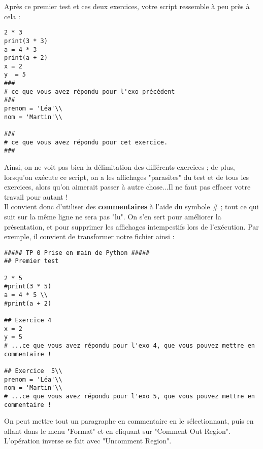 \begin{multicols}{2}
\exer{}



Après ce premier test et ces deux exercices, votre script ressemble à peu près à cela : 
\begin{lstlisting}
2 * 3
print(3 * 3)
a = 4 * 3
print(a + 2)
x = 2
y  = 5
###
# ce que vous avez répondu pour l'exo précédent 
###
prenom = 'Léa'\\
nom = 'Martin'\\

###
# ce que vous avez répondu pour cet exercice.
###
\end{lstlisting}
Ainsi, on ne voit pas bien la délimitation des différents exercices ; de plus, lorsqu'on exécute ce script, on a les affichages "parasites" du test et de tous les exercices, alors qu'on aimerait passer à autre chose...Il ne faut pas effacer votre travail pour autant !\\
Il convient donc d'utiliser des \textbf{commentaires} à l'aide du symbole \# ; tout ce qui suit sur la même ligne ne sera pas "lu". On s'en sert pour améliorer la présentation, et pour supprimer les affichages intempestifs lors de l'exécution. Par exemple, il convient de transformer notre fichier ainsi : 

\begin{lstlisting}
##### TP 0 Prise en main de Python #####
## Premier test

2 * 5           
#print(3 * 5) 
a = 4 * 5 \\
#print(a + 2) 

## Exercice 4
x = 2
y = 5 
# ...ce que vous avez répondu pour l'exo 4, que vous pouvez mettre en commentaire !

## Exercice  5\\
prenom = 'Léa'\\
nom = 'Martin'\\
# ...ce que vous avez répondu pour l'exo 5, que vous pouvez mettre en commentaire !
\end{lstlisting}

On peut mettre tout un paragraphe en commentaire en le sélectionnant, puis en allant dans le menu "Format" et en cliquant sur "Comment Out Region". L'opération inverse se fait avec "Uncomment Region".\\



\end{multicols}
